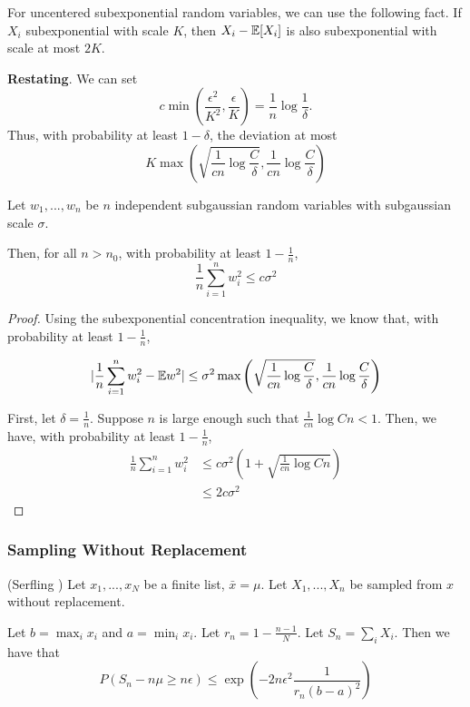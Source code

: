 For uncentered subexponential random variables, we can use the following fact. If $X_i$ subexponential with scale $K$, then $X_i - {\mathbb E}[X_i]$ is also subexponential with scale at most $2K$.

\textbf{Restating}. We can set
\[
c \min\left( \frac{\epsilon^2}{K^2}, \frac{\epsilon}{K} \right) = \frac{1}{n} \log \frac{1}{\delta}.
\]
Thus, with probability at least $1-\delta$, the deviation at most
\[
K \max\left( \sqrt{\frac{1}{cn} \log \frac{C}{\delta}},  \frac{1}{cn} \log \frac{C}{\delta} \right)
\]


\begin{corollary}
Let $w_1,...,w_n$ be $n$ independent subgaussian random variables with subgaussian scale $\sigma$. 

Then, for all $n > n_0$, with probability at least $1- \frac{1}{n}$,
\[
\frac{1}{n} \sum_{i=1}^n w_i^2 \leq c \sigma^2 
\]
\end{corollary}

\begin{proof}
Using the subexponential concentration inequality, we know that, with probability at least $1-\frac{1}{n}$, 

\[
| \frac{1}{n} \sum_{i=1}^n w_i^2 - {\mathbb E} w^2 | \leq \sigma^2 \max\left( \sqrt{\frac{1}{cn} \log \frac{C}{\delta}}, \frac{1}{cn}\log \frac{C}{\delta} \right)
\]

First, let $\delta = \frac{1}{n}$. Suppose $n$ is large enough such that $ \frac{1}{cn} \log Cn < 1$. Then, we have, with probability at least $1-\frac{1}{n}$,
\begin{align*}
 \frac{1}{n} \sum_{i=1}^n w_i^2 &\leq c\sigma^2 (1+\sqrt{\frac{1}{cn} \log Cn}) \\
		&\leq 2 c \sigma^2
 \end{align*}
 
\end{proof}

\subsubsection{Sampling Without Replacement}

\begin{lemma} (Serfling \cite{serfling1974probability}) 
Let $x_1,..., x_N$ be a finite list, $\bar{x} = \mu$. Let $X_1,...,X_n$ be sampled from $x$ without replacement. 

Let $b = \max_i x_i$ and $a = \min_i x_i$. Let $r_n = 1- \frac{n-1}{N}$. Let $S_n = \sum_i X_i$.
Then we have that
\[
P( S_n - n \mu \geq n \epsilon) \leq \exp( - 2 n \epsilon^2 \frac{1}{r_n (b-a)^2})
\]
\end{lemma}

